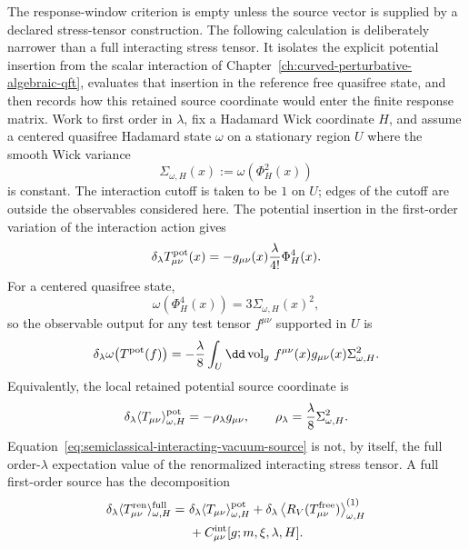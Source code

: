 The response-window criterion is empty unless the source vector is supplied
by a declared stress-tensor construction.  The following calculation is
deliberately narrower than a full interacting stress tensor.  It isolates the
explicit potential insertion from the scalar interaction of
Chapter~\ref{ch:curved-perturbative-algebraic-qft}, evaluates that insertion
in the reference free quasifree state, and then records how this retained
source coordinate would enter the finite response matrix.  Work to first
order in \(\lambda\), fix a Hadamard Wick coordinate \(H\), and assume a
centered quasifree Hadamard state \(\omega\) on a stationary region \(U\)
where the smooth Wick variance
\begin{equation}
  \Sigma_{\omega,H}(x)
  :=
  \omega\!\left(\Phi_H^2(x)\right)
  \label{eq:semiclassical-wick-variance}
\end{equation}
is constant.  The interaction cutoff is taken to be \(1\) on \(U\); edges of
the cutoff are outside the observables considered here.  The potential
insertion in the first-order variation of the interaction action gives
\begin{equation}
  \delta_\lambda T_{\mu\nu}^{\rm pot}(x)
  =
  -g_{\mu\nu}(x)\frac{\lambda}{4!}\Phi_H^4(x).
  \label{eq:semiclassical-interacting-potential-stress}
\end{equation}
For a centered quasifree state,
\[
  \omega\!\left(\Phi_H^4(x)\right)
  =
  3\Sigma_{\omega,H}(x)^2,
\]
so the observable output for any test tensor \(f^{\mu\nu}\) supported in
\(U\) is
\begin{equation}
  \delta_\lambda
  \omega\!\left(T^{\rm pot}(f)\right)
  =
  -\frac{\lambda}{8}
  \int_U\dd\operatorname{vol}_g\,
  f^{\mu\nu}(x)g_{\mu\nu}(x)\Sigma_{\omega,H}^2 .
  \label{eq:semiclassical-interacting-smeared-source}
\end{equation}
Equivalently, the local retained potential source coordinate is
\begin{equation}
  \delta_\lambda
  \langle T_{\mu\nu}\rangle_{\omega,H}^{\rm pot}
  =
  -\rho_\lambda g_{\mu\nu},
  \qquad
  \rho_\lambda
  =
  \frac{\lambda}{8}\Sigma_{\omega,H}^2 .
  \label{eq:semiclassical-interacting-vacuum-source}
\end{equation}
Equation~\eqref{eq:semiclassical-interacting-vacuum-source} is not, by
itself, the full order-\(\lambda\) expectation value of the renormalized
interacting stress tensor.  A full first-order source has the decomposition
\begin{equation}
\begin{aligned}
  \delta_\lambda
  \langle T_{\mu\nu}^{\rm ren}\rangle_{\omega,H}^{\rm full}
  =
  &\ \delta_\lambda
  \langle T_{\mu\nu}\rangle_{\omega,H}^{\rm pot}
  +\delta_\lambda
  \left\langle R_V(T_{\mu\nu}^{\rm free})\right\rangle_{\omega,H}^{(1)}
  \\
  &\ +C_{\mu\nu}^{\rm int}[g;m,\xi,\lambda,H] .
\end{aligned}
  \label{eq:semiclassical-full-interacting-source-ledger}
\end{equation}
